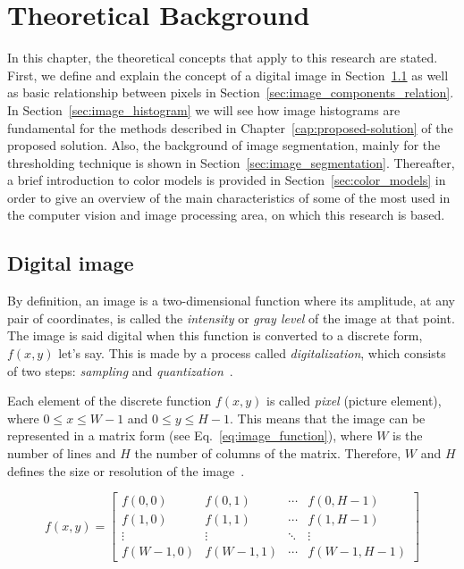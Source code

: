 \chapter{Theoretical Background}
\label{cap:conceitos}
In this chapter, the theoretical concepts that apply to this research are stated. First, we define and explain the concept of a digital image in Section~\ref{sec:digital_image} as well as basic relationship between pixels in Section~\ref{sec:image_components_relation}. In Section~\ref{sec:image_histogram} we will see how image histograms are fundamental for the methods described in Chapter~\ref{cap:proposed-solution} of the proposed solution. Also, the background of image segmentation, mainly for the thresholding technique is shown in Section~\ref{sec:image_segmentation}. Thereafter, a brief introduction to color models is provided in Section~\ref{sec:color_models} in order to give an overview of the main characteristics of some of the most used in the computer vision and image processing area, on which this research is based.

\section{Digital image}
\label{sec:digital_image}
By definition, an image is a two-dimensional function where its amplitude, at any pair of coordinates, is called the \textit{intensity} or \textit{gray level} of the image at that point. The image is said digital when this function is converted to a discrete form, $f(x, y)$ let's say. This is made by a process called \textit{digitalization}, which consists of two steps: \textit{sampling} and \textit{quantization}~\citep{gonzalez:02}.

Each element of the discrete function $f(x, y)$ is called \textit{pixel} (picture element), where $0 \leq x \leq W - 1$ and $0 \leq y \leq H - 1$. This means that the image can be represented in a matrix form (see Eq.~\ref{eq:image_function}), where $W$ is the number of lines and $H$ the number of columns of the matrix. Therefore, $W$ and $H$ defines the size or resolution of the image~\citep{pedrini:08}.

\begin{equation*}
f(x, y) =
 \begin{bmatrix}
  f(0, 0)     & f(0, 1)     & \cdots & f(0, H - 1) \\
  f(1, 0)     & f(1, 1)     & \cdots & f(1, H - 1) \\
  \vdots      & \vdots      & \ddots & \vdots  \\
  f(W - 1, 0) & f(W - 1, 1) & \cdots & f(W - 1, H - 1)
 \end{bmatrix}
\label{eq:image_function}
\end{equation*}

